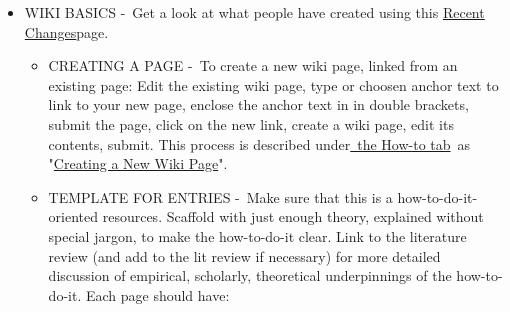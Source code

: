 \begin{itemize}
\item
  WIKI BASICS -~Get a look at what people have created using this
  \href{http://socialmediaclassroom.com/host/peeragogy/wikichanges}{Recent
  Changes}page.

  \begin{itemize}
  \item
    CREATING A PAGE -~To create a new wiki page, linked from an existing
    page: Edit the existing wiki page, type or choosen anchor text to
    link to your new page, enclose the anchor text in in double
    brackets, submit the page, click on the new link, create a wiki
    page, edit its contents, submit. This process is described
    under\href{http://socialmediaclassroom.com/host/peeragogy/page/how}{~the
    How-to tab}~as
    "\href{http://socialmediaclassroom.com/host/peeragogy/slideshow/creating-a-new-wiki-page}{Creating
    a New Wiki Page}".
  \item
    TEMPLATE FOR ENTRIES -~Make sure that this is a
    how-to-do-it-oriented resources. Scaffold with just enough theory,
    explained without special jargon, to make the how-to-do-it clear.
    Link to the literature review (and add to the lit review if
    necessary) for more detailed discussion of empirical, scholarly,
    theoretical underpinnings of the how-to-do-it. Each page should
    have:


\end{itemize}
\end{itemize}
